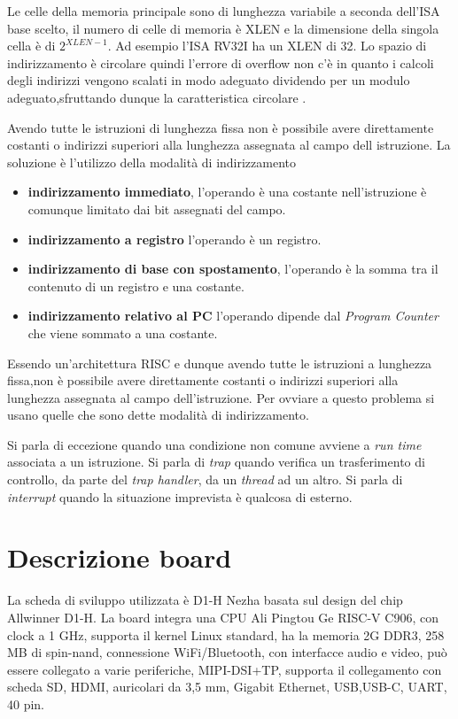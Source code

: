\documentclass[12pt, a4paper]{report}
\begin{document}
Le celle della memoria principale sono di lunghezza variabile a seconda dell'ISA base scelto, il numero di celle di memoria è XLEN e la dimensione della singola cella è di $2^{XLEN - 1}$. Ad esempio l'ISA RV32I ha un XLEN di 32. Lo spazio di indirizzamento è circolare quindi l'errore di overflow non c'è in quanto i calcoli degli indirizzi vengono scalati in modo adeguato dividendo per un modulo adeguato,sfruttando dunque la caratteristica circolare \cite{ISA}.


Avendo tutte le istruzioni di lunghezza fissa non è possibile avere direttamente costanti o indirizzi superiori alla lunghezza assegnata al campo dell istruzione. La soluzione è l'utilizzo della modalità di indirizzamento
\begin{itemize}
	\item \textbf{indirizzamento immediato}, l’operando è una costante nell’istruzione è comunque limitato dai bit assegnati del campo.
	\item \textbf{indirizzamento a registro} l’operando è un registro.
	\item \textbf{indirizzamento di base con spostamento}, l’operando è la somma tra il
contenuto di un registro e una costante.
\item \textbf{indirizzamento relativo al PC} l'operando dipende dal \textit{Program Counter} che viene sommato a una costante.
\end{itemize}

Essendo un’architettura RISC e dunque avendo tutte le istruzioni a lunghezza fissa,non è possibile avere direttamente costanti o indirizzi superiori alla lunghezza assegnata al campo dell’istruzione. Per ovviare a questo problema si usano quelle che sono dette modalità di indirizzamento.

Si parla di eccezione quando una condizione non comune avviene a \textit{run time} associata a un istruzione.
Si parla di \textit{trap} quando verifica un trasferimento di controllo, da parte del \textit{trap handler}, da un \textit{thread} ad un altro. Si parla di \textit{interrupt} quando la situazione imprevista è qualcosa di esterno.



\section{Descrizione board} 

La scheda di sviluppo utilizzata è D1-H Nezha basata sul design del chip Allwinner D1-H. La board integra una CPU Ali Pingtou Ge RISC-V C906, con clock a 1 GHz, supporta il kernel Linux standard, ha la memoria 2G DDR3, 258 MB di spin-nand, connessione WiFi/Bluetooth, con interfacce audio e video, può essere collegato a varie periferiche, MIPI-DSI+TP, supporta il collegamento con scheda SD, HDMI, auricolari da 3,5 mm, Gigabit Ethernet, USB,USB-C, UART, 40 pin.
\end{document}
